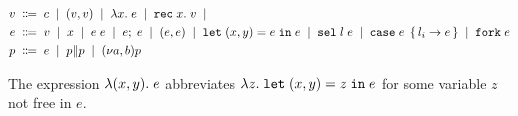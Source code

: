 \begin{align*}
  v \grmdef&
    c                        \grmor
    (v, v)                   \grmor
    \ELam x e                \grmor
    \ERec x v                \grmor
  \\
  e \grmdef&
    v                       \grmor
    x                       \grmor
    e \; e                  \grmor
    \ELetU e e              \grmor
    (e, e)                  \grmor
    \ELetP x y e e          \grmor
    \ESelect l e            \grmor
    \ECase e { l_i \rightarrow e } \grmor
    \EFork e
  \\
  p \grmdef&
    e                       \grmor
    \PPar p p               \grmor
    \PScope p
\end{align*}

The expression $\lambda (x,y).\; e$ abbreviates $\lambda z.\; \mathtt{let}\; (x,y) = z \;\mathtt{in}\; e$
for some variable $z$ not free in $e$.


